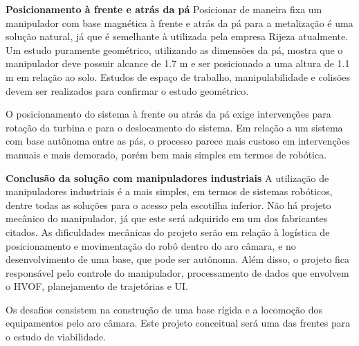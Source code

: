 \textbf{Posicionamento à frente e atrás da pá}
Posicionar de maneira fixa um manipulador com base magnética à frente e atrás da
pá para a metalização é uma solução natural, já que é semelhante à utilizada pela
empresa Rijeza atualmente. Um estudo puramente geométrico, utilizando as
dimensões da pá, mostra que o manipulador deve possuir alcance de 1.7 m e ser
posicionado a uma altura de 1.1 m em relação ao solo. Estudos de espaço de
trabalho, manipulabilidade e colisões devem ser realizados para confirmar o
estudo geométrico.

O posicionamento do sistema à frente ou atrás da pá exige intervenções para
rotação da turbina e para o deslocamento do sistema. Em relação a um
sistema com base autônoma entre as pás, o processo parece mais custoso em
intervenções manuais e mais demorado, porém bem mais simples em termos de
robótica.

\textbf{Conclusão da solução com manipuladores industriais}
A utilização de manipuladores industriais é a mais simples, em termos de
sistemas robóticos, dentre todas as soluções para o acesso pela escotilha
inferior.
Não há projeto mecânico do manipulador, já que este será adquirido em um dos fabricantes citados. As dificuldades mecânicas do projeto serão em relação à logística de posicionamento
e movimentação do robô dentro do aro câmara, e no desenvolvimento de uma base,
que pode ser autônoma. Além disso, o projeto fica responsável pelo controle do
manipulador, processamento de dados que envolvem o HVOF, planejamento de
trajetórias e UI.

Os desafios consistem na construção de uma base rígida e a locomoção dos
equipamentos pelo aro câmara. Este projeto conceitual será uma das frentes para
o estudo de viabilidade.
